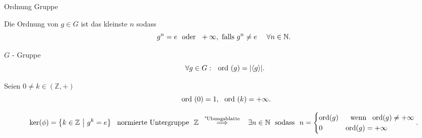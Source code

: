 \documentclass[class=article, crop=false]{standalone}
\begin{document}
\begin{zettel}{Ordnung Gruppe}
\begin{flashcard}
	\begin{definition}[Ordnung]
		Die Ordnung von $g \in  G$ ist das kleinste $n$ sodass
		\[
			g^n  = e \tx{ oder } +\infty, \text{ falls } g^n  \neq  e \quad \forall n \in  \mathbb{N}
		.\]
	\end{definition}
\end{flashcard}
\begin{theorem}
	$G$ - Gruppe
	\[
		\forall g \in  G : \tx{ ord}(g) = |\langle g \rangle|
	.\]
\end{theorem}
\begin{example}
	Seien $0 \neq k \in  (\mathbb{Z}, +)$
	\[
		\tx{ ord}(0) = 1, \tx{ ord}(k) = + \infty
	.\]
\end{example}

\begin{theorem}
	\[
		\ker (\phi) =  \set{k \in  \mathbb{Z}}{g^k =  e} \tx{ normierte Untergruppe }  \mathbb{Z} \stackrel{\tx{ "Ubungsblatte } }{\implies} \exists n \in  \mathbb{N} \tx{ sodass } n =  \begin{cases}
			\ord(g) & \tx{  wenn } \ord(g) \neq + \infty \\
			0       & \ord(g) =  + \infty                \\
		\end{cases}
	.\]

\end{theorem}
\end{zettel}
\end{document}
